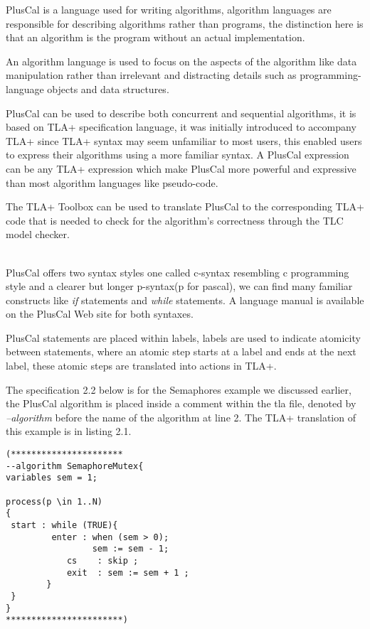 \documentclass{thesul}
\begin{document}
PlusCal is a language used for writing algorithms, algorithm languages are responsible for describing algorithms rather than programs, the distinction here is that an algorithm is the program without an actual implementation.

An algorithm language is used to focus on the aspects of the algorithm like data manipulation rather than irrelevant and distracting details such as programming-language objects and data structures.

PlusCal can be used to describe both concurrent and sequential algorithms, it is based on TLA+ specification language, it was initially introduced to accompany TLA+ since TLA+ syntax may seem unfamiliar to most users, this enabled users to express their algorithms using a more familiar syntax. A PlusCal expression can be any TLA+ expression which make PlusCal more powerful and expressive than most algorithm languages like pseudo-code. 

The TLA+ Toolbox can be used to translate PlusCal to the corresponding TLA+ code that is needed to check for the algorithm's correctness through the TLC model checker.

\hfill\\
PlusCal offers two syntax styles one called c-syntax resembling c programming style and a clearer but longer p-syntax(p for pascal), we can find many familiar constructs like \textit{if} statements and \textit{while} statements. A language manual is available on the PlusCal Web site for both syntaxes.

PlusCal statements are placed within labels, labels are used to indicate atomicity between statements, where an atomic step starts at a label and ends at the next label, these atomic steps are translated into actions in TLA+.

The specification 2.2 below is for the Semaphores example we discussed earlier, the PlusCal algorithm is placed inside a comment within the tla file, denoted by \textit{--algorithm} before the name of the algorithm at line 2. The TLA+ translation of this example is in listing 2.1.
 
\begin{lstlisting}[caption = PlusCal, frame = tlrb, firstnumber = 1]
(**********************
--algorithm SemaphoreMutex{
variables sem = 1;

process(p \in 1..N)
{
 start : while (TRUE){
         enter : when (sem > 0);
                 sem := sem - 1;            
            cs    : skip ;
            exit  : sem := sem + 1 ;
        }
 }
}
***********************)

\end{lstlisting}
 
\end{document}
